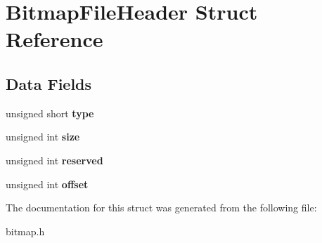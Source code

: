 \hypertarget{struct_bitmap_file_header}{}\section{Bitmap\+File\+Header Struct Reference}
\label{struct_bitmap_file_header}
\subsection*{Data Fields}
\begin{DoxyCompactItemize}
\item 
\hypertarget{struct_bitmap_file_header_aa929142c5ddf34cf0915c97a617a1a63}{}\label{struct_bitmap_file_header_aa929142c5ddf34cf0915c97a617a1a63} 
unsigned short {\bfseries type}
\item 
\hypertarget{struct_bitmap_file_header_aac913b3a1f6ef005d66bf7a84428773e}{}\label{struct_bitmap_file_header_aac913b3a1f6ef005d66bf7a84428773e} 
unsigned int {\bfseries size}
\item 
\hypertarget{struct_bitmap_file_header_a05d5cbcb44f437341bd9fa37d589aced}{}\label{struct_bitmap_file_header_a05d5cbcb44f437341bd9fa37d589aced} 
unsigned int {\bfseries reserved}
\item 
\hypertarget{struct_bitmap_file_header_a29b5297d3393519050e3126c4cb07c1c}{}\label{struct_bitmap_file_header_a29b5297d3393519050e3126c4cb07c1c} 
unsigned int {\bfseries offset}
\end{DoxyCompactItemize}


The documentation for this struct was generated from the following file\+:\begin{DoxyCompactItemize}
\item 
bitmap.\+h\end{DoxyCompactItemize}
